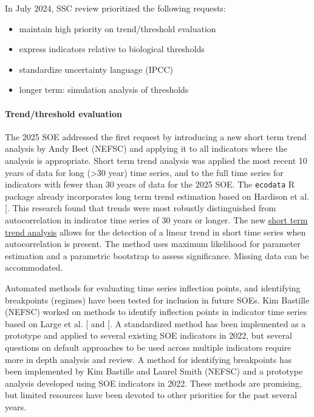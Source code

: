 \documentclass[
  10pt,
]{article}
\providecommand{\tightlist}{%
  \setlength{\itemsep}{0pt}\setlength{\parskip}{0pt}}
\begin{document}
In July 2024, SSC review prioritized the following requests:

\begin{itemize}
\tightlist
\item
  maintain high priority on trend/threshold evaluation
\item
  express indicators relative to biological thresholds
\item
  standardize uncertainty language (IPCC)
\item
  longer term: simulation analysis of thresholds
\end{itemize}

\paragraph{Trend/threshold evaluation}\label{trendthreshold-evaluation}

The 2025 SOE addressed the first request by introducing a new short term
trend analysis by Andy Beet (NEFSC) and applying it to all indicators
where the analysis is appropriate. Short term trend analysis was applied
the most recent 10 years of data for long (\textgreater30 year) time
series, and to the full time series for indicators with fewer than 30
years of data for the 2025 SOE. The \texttt{ecodata} R package already
incorporates long term trend estimation based on Hardison et al.
{[}\citeproc{ref-hardison_simulation_2019}{2}{]}. This research found
that trends were most robustly distinguished from autocorrelation in
indicator time series of 30 years or longer. The new
\href{https://noaa-edab.github.io/tech-doc/short-term-trend-analysis.html}{short
term trend analysis} allows for the detection of a linear trend in short
time series when autocorrelation is present. The method uses maximum
likelihood for parameter estimation and a parametric bootstrap to assess
significance. Missing data can be accommodated.

Automated methods for evaluating time series inflection points, and
identifying breakpoints (regimes) have been tested for inclusion in
future SOEs. Kim Bastille (NEFSC) worked on methods to identify
inflection points in indicator time series based on Large et al.
{[}\citeproc{ref-large_defining_2013}{3}{]} and
{[}\citeproc{ref-large_quantifying_2015}{4}{]}. A standardized method
has been implemented as a prototype and applied to several existing SOE
indicators in 2022, but several questions on default approaches to be
used across multiple indicators require more in depth analysis and
review. A method for identifying breakpoints has been implemented by Kim
Bastille and Laurel Smith (NEFSC) and a prototype analysis developed
using SOE indicators in 2022. These methods are promising, but limited
resources have been devoted to other priorities for the past several
years.
\end{document}
